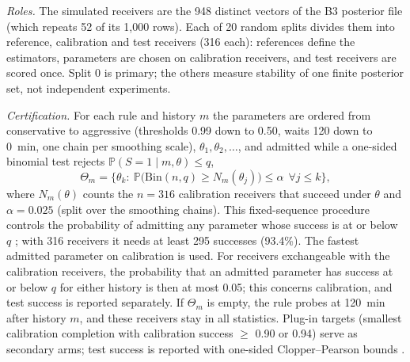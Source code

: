 \documentclass[conference]{IEEEtran}
\newcommand{\Prob}{\mathbb{P}}
\begin{document}
\emph{Roles.} The simulated receivers are the 948 distinct vectors of the B3 posterior file (which repeats 52 of its 1,000 rows). Each of 20 random splits divides them into reference, calibration and test receivers (316 each): references define the estimators, parameters are chosen on calibration receivers, and test receivers are scored once. Split 0 is primary; the others measure stability of one finite posterior set, not independent experiments.

\emph{Certification.} For each rule and history $m$ the parameters are ordered from conservative to aggressive (thresholds 0.99 down to 0.50, waits 120 down to 0~min, one chain per smoothing scale), $\theta_1,\theta_2,\ldots$, and admitted while a one-sided binomial test rejects $\Prob(S=1\mid m,\theta)\le q$,
\begin{equation}
 \Theta_m=\big\{\theta_k:\ \Prob\big(\mathrm{Bin}(n,q)\ge N_m(\theta_j)\big)\le\alpha\ \ \forall j\le k\big\},
 \label{eq:certify}
\end{equation}
where $N_m(\theta)$ counts the $n=316$ calibration receivers that succeed under $\theta$ and $\alpha=0.025$ (split over the smoothing chains). This fixed-sequence procedure controls the probability of admitting any parameter whose success is at or below $q$ \cite{angelopoulos2021}; with 316 receivers it needs at least 295 successes (93.4\%). The fastest admitted parameter on calibration is used. For receivers exchangeable with the calibration receivers, the probability that an admitted parameter has success at or below $q$ for either history is then at most 0.05; this concerns calibration, and test success is reported separately. If $\Theta_m$ is empty, the rule probes at 120~min after history $m$, and these receivers stay in all statistics. Plug-in targets (smallest calibration completion with calibration success $\geq$ 0.90 or 0.94) serve as secondary arms; test success is reported with one-sided Clopper--Pearson bounds \cite{clopper1934}.
\end{document}
